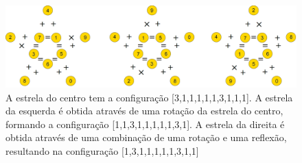 \begin{figure}[h]
\centering
\includegraphics[width=\textwidth]{figuras/rotated.png}
\caption{A estrela do centro tem a configuração [3,1,1,1,1,1,3,1,1,1]. A estrela da esquerda é obtida através de uma rotação da estrela do centro, formando a configuração [1,1,3,1,1,1,1,1,3,1]. A estrela da direita é obtida através de uma combinação de uma rotação e uma reflexão, resultando na configuração [1,3,1,1,1,1,1,3,1,1]}
\label{fig: ops_restriction}
\end{figure}